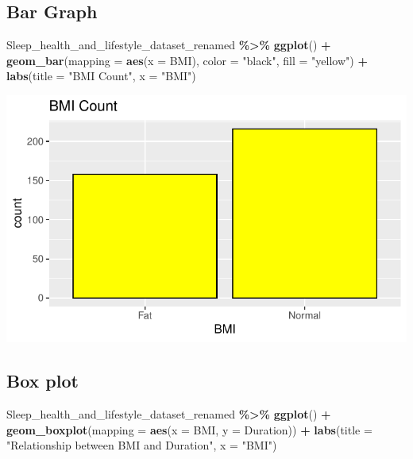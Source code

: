 \documentclass[
  11pt,
]{article}
\newenvironment{Shaded}{\begin{snugshade}}{\end{snugshade}}
\newcommand{\AttributeTok}[1]{\textcolor[rgb]{0.13,0.29,0.53}{#1}}
\newcommand{\FunctionTok}[1]{\textcolor[rgb]{0.13,0.29,0.53}{\textbf{#1}}}
\newcommand{\NormalTok}[1]{#1}
\newcommand{\SpecialCharTok}[1]{\textcolor[rgb]{0.81,0.36,0.00}{\textbf{#1}}}
\newcommand{\StringTok}[1]{\textcolor[rgb]{0.31,0.60,0.02}{#1}}
\begin{document}
\hypertarget{bar-graph}{%
\subsection{Bar Graph}\label{bar-graph}}

\begin{Shaded}
\begin{Highlighting}[]
\NormalTok{Sleep\_health\_and\_lifestyle\_dataset\_renamed }\SpecialCharTok{\%\textgreater{}\%}
  \FunctionTok{ggplot}\NormalTok{() }\SpecialCharTok{+}
    \FunctionTok{geom\_bar}\NormalTok{(}\AttributeTok{mapping =} \FunctionTok{aes}\NormalTok{(}\AttributeTok{x =}\NormalTok{ BMI), }\AttributeTok{color =} \StringTok{"black"}\NormalTok{, }\AttributeTok{fill =} \StringTok{"yellow"}\NormalTok{) }\SpecialCharTok{+}
    \FunctionTok{labs}\NormalTok{(}\AttributeTok{title =} \StringTok{"BMI Count"}\NormalTok{, }\AttributeTok{x =} \StringTok{"BMI"}\NormalTok{)}
\end{Highlighting}
\end{Shaded}

\begin{center}\includegraphics[width=0.7\linewidth]{SleepHelath_files/figure-latex/unnamed-chunk-43-1} \end{center}

\hypertarget{box-plot-1}{%
\subsection{Box plot}\label{box-plot-1}}

\begin{Shaded}
\begin{Highlighting}[]
\NormalTok{Sleep\_health\_and\_lifestyle\_dataset\_renamed }\SpecialCharTok{\%\textgreater{}\%}
  \FunctionTok{ggplot}\NormalTok{() }\SpecialCharTok{+}
    \FunctionTok{geom\_boxplot}\NormalTok{(}\AttributeTok{mapping =} \FunctionTok{aes}\NormalTok{(}\AttributeTok{x =}\NormalTok{ BMI, }\AttributeTok{y =}\NormalTok{ Duration)) }\SpecialCharTok{+}
    \FunctionTok{labs}\NormalTok{(}\AttributeTok{title =} \StringTok{"Relationship between BMI and Duration"}\NormalTok{, }\AttributeTok{x =} \StringTok{"BMI"}\NormalTok{)}
\end{Highlighting}
\end{Shaded}
\end{document}
